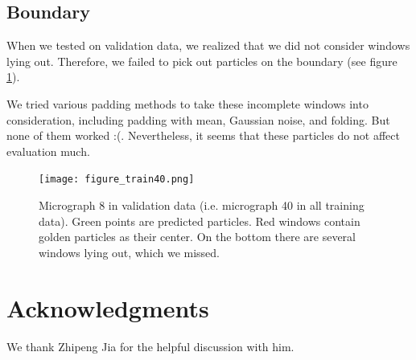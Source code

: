 \documentclass[11pt]{article}
\begin{document}
\subsection{Boundary}
When we tested on validation data, we realized that we did not consider windows lying out. Therefore, we failed to pick out particles on the boundary (see figure \ref{boundary}).

We tried various padding methods to take these incomplete windows into consideration, including padding with mean, Gaussian noise, and folding. But none of them worked :(. Nevertheless, it seems that these particles do not affect evaluation much.

\begin{figure}[htbp]
\centering
    \texttt{[image: figure\_train40.png]}
\caption{Micrograph 8 in validation data (i.e. micrograph 40 in all training data). Green points are predicted particles. Red windows contain golden particles as their center. On the bottom there are several windows lying out, which we missed.}\label{boundary}
\end{figure}

\section*{Acknowledgments}
We thank Zhipeng Jia for the helpful discussion with him.




\end{document}
